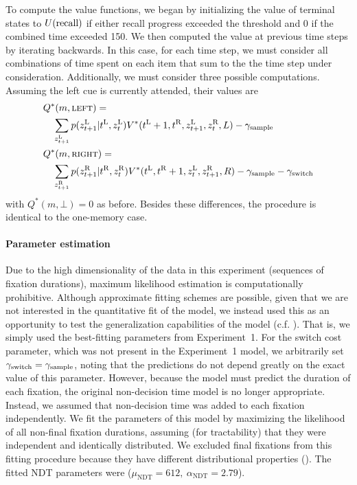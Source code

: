 To compute the value functions, we began by initializing the value of terminal states to $U({\text{recall}})$ if either recall progress exceeded the threshold and 0 if the combined time exceeded 150. We then computed the value at previous time steps by iterating backwards. In this case, for each time step, we must consider all combinations of time spent on each item that sum to the the time step under consideration. Additionally, we must consider three possible computations. Assuming the left cue is currently attended, their values are
%
\begin{equation}
\begin{aligned}
  &Q^*(m, \textsc{left}) = \\
    &\quad\sum_{z^{\text{L}}_{t+1}} p(z^{\text{L}}_{t+1} | t^{\text{L}}, z^{\text{L}}_t) 
    V^*(t^{\text{L}}+1, t^{\text{R}}, z^{\text{L}}_{t+1}, z^{\text{R}}_t, L) - \gamma_\text{sample} \\
  &Q^*(m, \textsc{right}) = \\
    &\quad\sum_{z^{\text{R}}_{t+1}} p(z^{\text{R}}_{t+1} | t^{\text{R}}, z^{\text{R}}_t) 
    V^*(t^{\text{L}}, t^{\text{R}}+1, z^{\text{L}}_{t}, z^{\text{R}}_{t+1}, R) - \gamma_\text{sample} - \gamma_\text{switch}\\
\end{aligned}
\end{equation}
%
with $Q^*(m, \bot) = 0$ as before. Besides these differences, the procedure is identical to the one-memory case.

\paragraph{Parameter estimation}

Due to the high dimensionality of the data in this experiment (sequences of fixation durations), maximum likelihood estimation is computationally prohibitive. Although approximate fitting schemes are possible, given that we are not interested in the quantitative fit of the model, we instead used this as an opportunity to test the generalization capabilities of the model (c.f. \citealp{krajbich2011multialternative}). That is, we simply used the best-fitting parameters from Experiment~1. For the switch cost parameter, which was not present in the Experiment~1 model, we arbitrarily set $\gamma_\text{switch} = \gamma_\text{sample}$, noting that the predictions do not depend greatly on the exact value of this parameter. However, because the model must predict the duration of each fixation, the original non-decision time model is no longer appropriate. Instead, we assumed that non-decision time was added to each fixation independently. We fit the parameters of this model by maximizing the likelihood of all non-final fixation durations, assuming (for tractability) that they were independent and identically distributed. We excluded final fixations from this fitting procedure because they have different distributional properties (). The fitted NDT parameters were (\(
    \mu_\text{NDT} = 612,\ 
    \alpha_\text{NDT} = 2.79
\)).

